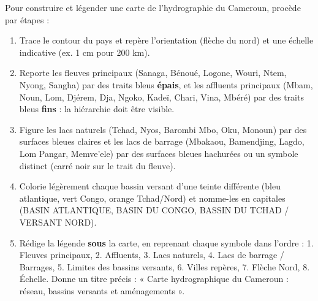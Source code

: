 \documentclass[11pt]{article}
\begin{document}
\begin{methode}
Pour construire et légender une carte de l'hydrographie du Cameroun, procède par étapes :
\begin{enumerate}
\item Trace le contour du pays et repère l'orientation (flèche du nord) et une échelle indicative (ex. 1 cm pour 200 km).
\item Reporte les fleuves principaux (Sanaga, Bénoué, Logone, Wouri, Ntem, Nyong, Sangha) par des traits bleus \textbf{épais}, et les affluents principaux (Mbam, Noun, Lom, Djérem, Dja, Ngoko, Kadeï, Chari, Vina, Mbéré) par des traits bleus \textbf{fins} : la hiérarchie doit être visible.
\item Figure les lacs naturels (Tchad, Nyos, Barombi Mbo, Oku, Monoun) par des surfaces bleues claires et les lacs de barrage (Mbakaou, Bamendjing, Lagdo, Lom Pangar, Memve'ele) par des surfaces bleues hachurées ou un symbole distinct (carré noir sur le trait du fleuve).
\item Colorie légèrement chaque bassin versant d'une teinte différente (bleu atlantique, vert Congo, orange Tchad/Nord) et nomme-les en capitales (BASIN ATLANTIQUE, BASIN DU CONGO, BASSIN DU TCHAD / VERSANT NORD).
\item Rédige la légende \textbf{sous} la carte, en reprenant chaque symbole dans l'ordre : 1. Fleuves principaux, 2. Affluents, 3. Lacs naturels, 4. Lacs de barrage / Barrages, 5. Limites des bassins versants, 6. Villes repères, 7. Flèche Nord, 8. Échelle. Donne un titre précis : « Carte hydrographique du Cameroun : réseau, bassins versants et aménagements ».
\end{enumerate}
\end{methode}
\end{document}
